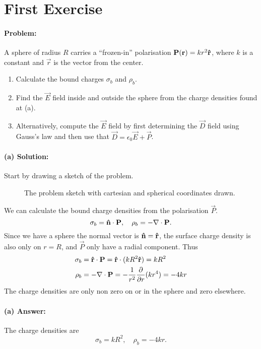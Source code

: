 \section{First Exercise}
\paragraph{Problem:} A sphere of radius $R$ carries a ``frozen-in'' polarisation $\mathbf{P}(\mathbf{r}) = kr^2 \mathbf{\hat{r}}$, where $k$ is a constant
and $\vec{r}$ is the vector from the center.
\begin{enumerate}[label=(\alph*)]
    \item Calculate the bound charges $\sigma_b$ and $\rho_b$.
    \item Find the $\vec{E}$ field inside and outside the sphere from the charge densities found at (a).
    \item Alternatively, compute the $\vec{E}$ field by first determining the $\vec{D}$ field using Gauss's law and then use that $\vec{D} = \epsilon_0 \vec{E} + \vec{P}$.
\end{enumerate}

\paragraph{(a) Solution:}
Start by drawing a sketch of the problem.
\begin{figure}[H]
    \centering
    
    \caption{The problem sketch with cartesian and spherical coordinates drawn.}\label{fig:sketch}
\end{figure}
We can calculate the bound charge densities from the polarisation $\vec{P}$.
\begin{equation}
    \sigma_b = \mathbf{\hat{n}} \cdot \mathbf{P}, \quad \rho_b = - \nabla \cdot \mathbf{P}.
\end{equation}
Since we have a sphere the normal vector is $\mathbf{\hat{n}} = \mathbf{\hat{r}}$, the surface charge density is also only on $r=R$, and $\vec{P}$ only have a radial component. Thus
\begin{align}
    \sigma_b &= \mathbf{\hat{r}} \cdot \mathbf{P} = \mathbf{\hat{r}} \cdot (kR^2 \mathbf{\hat{r}}) = kR^2\\
    \rho_b &= -\nabla \cdot \mathbf{P} = -\frac{1}{r^2} \frac{\partial}{\partial r} (kr^4) = -4kr
\end{align}
The charge densities are only non zero on or in the sphere and zero elsewhere.

\paragraph{(a) Answer:} The charge densities are
\begin{equation}
    \sigma_b = kR^2, \quad \rho_b = -4kr.
\end{equation}

